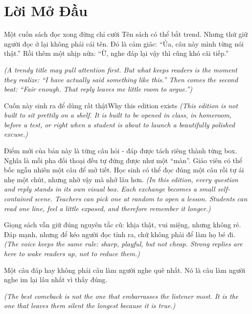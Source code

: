 \chapter*{Lời Mở Đầu}

\begin{quotecard}{Một cuốn sách đọc xong đừng chỉ cười}
Tên sách có thể bắt trend. Nhưng thứ giữ người đọc ở lại không phải cái tên. Đó là cảm giác: “Ủa, câu này mình từng nói thật.” Rồi thêm một nhịp nữa: “Ừ, nghe đáp lại vậy thì cũng khó cãi tiếp.”

\textit{(A trendy title may pull attention first. But what keeps readers is the moment they realize: “I have actually said something like this.” Then comes the second beat: “Fair enough. That reply leaves me little room to argue.”)}
\end{quotecard}

\begin{truyen}{Cuốn này sinh ra để dùng rất thật}{Why this edition exists}
\textit{(This edition is not built to sit prettily on a shelf. It is built to be opened in class, in homeroom, before a test, or right when a student is about to launch a beautifully polished excuse.)}

Điểm mới của bản này là từng câu hỏi - đáp được tách riêng thành từng box. Nghĩa là mỗi pha đối thoại đều tự đứng được như một “màn”. Giáo viên có thể bốc ngẫu nhiên một câu để mở tiết. Học sinh có thể đọc đúng một câu rồi tự ái nhẹ một chút, nhưng nhờ vậy mà nhớ lâu hơn.
\textit{(In this edition, every question and reply stands in its own visual box. Each exchange becomes a small self-contained scene. Teachers can pick one at random to open a lesson. Students can read one line, feel a little exposed, and therefore remember it longer.)}

Giọng sách vẫn giữ đúng nguyên tắc cũ: khịa thật, vui miệng, nhưng không rẻ. Đáp mạnh, nhưng để kéo người đọc tỉnh ra, chứ không phải để làm họ bé đi.
\textit{(The voice keeps the same rule: sharp, playful, but not cheap. Strong replies are here to wake readers up, not to reduce them.)}
\end{truyen}

\begin{baihoc}
Một câu đáp hay không phải câu làm người nghe quê nhất. Nó là câu làm người nghe im lại lâu nhất vì thấy đúng.

\textit{(The best comeback is not the one that embarrasses the listener most. It is the one that leaves them silent the longest because it is true.)}
\end{baihoc}

